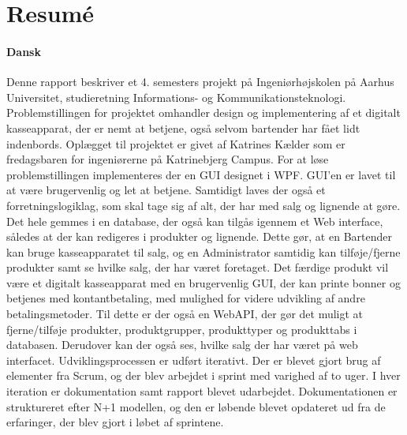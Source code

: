 \chapter{Resumé}
\subsubsection*{Dansk}

Denne rapport beskriver et 4. semesters projekt på Ingeniørhøjskolen på Aarhus Universitet, studieretning Informations- og Kommunikationsteknologi. 
Problemstillingen for projektet omhandler design og implementering af et digitalt kasseapparat, der er nemt at betjene, også selvom bartender har fået lidt indenbords. 
Oplægget til projektet er givet af Katrines Kælder som er fredagsbaren for ingeniørerne på Katrinebjerg Campus.
\newline
\newline
For at løse problemstillingen implementeres der en \gls{GUI} designet i \gls{WPF}. \gls{GUI}'en er lavet til at være brugervenlig og let at betjene. 
Samtidigt laves der også et forretningslogiklag, som skal tage sig af alt, der har med salg og lignende at gøre. 
Det hele gemmes i en database, der også kan tilgås igennem et Web interface, således at der kan redigeres i produkter og lignende. 
Dette gør, at en Bartender kan bruge kasseapparatet til salg, og en Administrator samtidig kan tilføje/fjerne produkter samt se hvilke salg, der har været foretaget.
\newline
\newline
Det færdige produkt vil være et digitalt kasseapparat med en brugervenlig \gls{GUI}, 
der kan printe bonner og betjenes med kontantbetaling, med mulighed for videre udvikling af andre betalingsmetoder. 
Til dette er der også en \gls{WebAPI}, der gør det muligt at fjerne/tilføje produkter, produktgrupper, produkttyper og produkttabs i databasen. 
Derudover kan der også ses, hvilke salg der har været på web interfacet.
\newline
\newline
Udviklingsprocessen er udført iterativt. 
Der er blevet gjort brug af elementer fra Scrum, og der blev arbejdet i sprint med varighed af to uger. 
I hver iteration er dokumentation samt rapport blevet udarbejdet. 
Dokumentationen er struktureret efter N+1 modellen, og den er løbende blevet opdateret ud fra de erfaringer, der blev gjort i løbet af sprintene.   
\newline
\newline
















